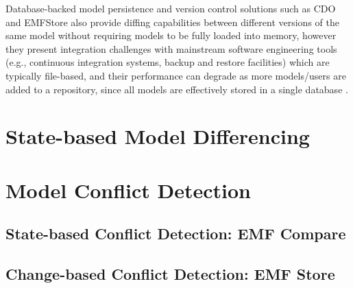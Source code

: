 Database-backed model persistence and version control solutions such as CDO \cite{eclipse2019cdo} and EMFStore \cite{koegel2010emfstore} also provide diffing capabilities between different versions of the same model without requiring models to be fully loaded into memory, however they present integration challenges with mainstream software engineering tools (e.g., continuous integration systems, backup and restore facilities) which are typically file-based, and their performance can degrade as more models/users are added to a repository, since all models are effectively stored in a single database \cite{KolovosRMPGCLRV13}.


\section{State-based Model Differencing}
\label{sec:state-based_model_differencing}


\section{Model Conflict Detection}
\label{sec:model_conflict_detection}

\subsection{State-based Conflict Detection: EMF Compare}
\label{sec:emfcompare_conflict_detection}

\subsection{Change-based Conflict Detection: EMF Store}
\label{sec:emfstore_l_conflict_detection}



